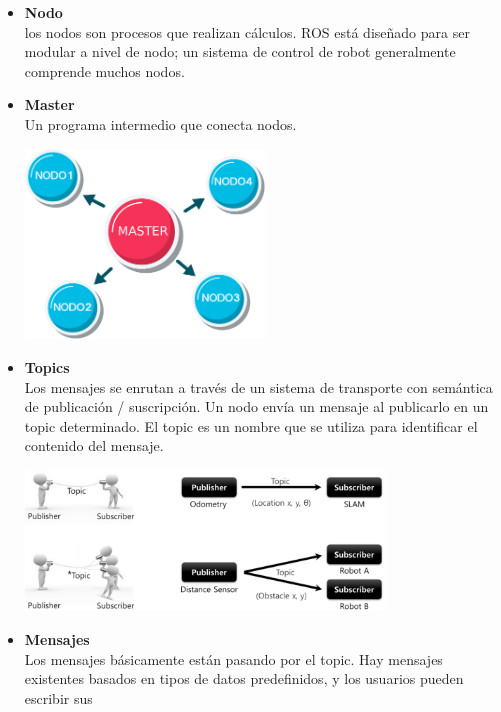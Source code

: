 \begin{itemize}
    \item \textbf{Nodo}\\
    los nodos son procesos que realizan cálculos. ROS está diseñado para ser modular 
    a nivel de nodo; un sistema de control de robot generalmente comprende muchos nodos.
    \item \textbf{Master}\\
    Un programa intermedio que conecta nodos.
    \begin{center}
        \includegraphics[width=0.5\textwidth]{Capitulo2/Fig2.eps}       
        \label{Fig2}
    \end{center}
    \item \textbf{Topics}\\
    Los mensajes se enrutan a través de un sistema de transporte con semántica de 
    publicación / suscripción. Un nodo envía un mensaje al publicarlo en un topic 
    determinado. El topic es un nombre que se utiliza para identificar el contenido del 
    mensaje.
    \begin{center}
        \includegraphics[width=0.75\textwidth]{Capitulo2/Fig3.eps}       
        \label{Fig3}
    \end{center}
    \item \textbf{Mensajes}\\
    Los mensajes básicamente están pasando por el topic. Hay mensajes existentes 
    basados en tipos de datos predefinidos, y los usuarios pueden escribir sus 

\end{itemize}

